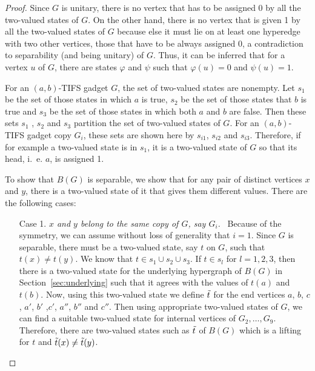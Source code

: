 \documentclass[%
12pt,
prereprint,
showpacs,
showkeys,
preprintnumbers,
amsmath,amssymb,
aps,
pra,
longbibliography,
notitlepage
]{revtex4-1}
\theoremstyle{definition}
\begin{document}
	\begin{proof}
		Since $G$ is unitary, there is no vertex that has to be assigned 0 by all the two-valued states of $G$. On the other hand, there is no vertex that is given 1 by all the two-valued states of $G$ because else it must lie on at least one hyperedge with two other vertices, those that have to be always assigned 0, a contradiction to separability (and being unitary) of $G$. Thus, it can be inferred that for a vertex $u$ of $G$, there are states $\varphi$ and $\psi$ such that $\varphi (u)=0$ and $\psi (u)=1$.
		
		For an $(a ,b )$-TIFS gadget $G$, the set of two-valued states are nonempty. Let $s_{1}$ be the set of those states in which $a$ is true, $s_{2}$ be the set of those states that $b$ is true and $s_{3}$ be the set of those states in which both $a$ and $b$ are false. Then these sets $s_{1}$ , $s_{2}$ and $s_{3}$ partition the set of two-valued states of $G$. For an $(a ,b )$-TIFS gadget copy $G_i$, these sets are shown here by $s_{i1}$, $s_{i2}$ and $s_{i3}$. Therefore, if for example a two-valued state is in $s_{1}$, it is a two-valued state of $G$ so that its head, i.~e. $a$, is assigned 1.
		
		To show that $B(G)$ is separable, we show that for any pair of distinct vertices $x$ and $y$, there is a two-valued state of it that gives them different values. There are the following cases:
		
		\begin{itemize}
			\item[Case 1.] \emph{$x$ and $y$ belong to the same copy of $G$, say $G_i$.} \ Because of the symmetry, we can assume without loss of generality that $i=1$.  Since $G$ is separable, there must be a two-valued state, say $t$ on $G$, such that $t(x)\neq t(y)$. We know that $t\in s_{1}\cup s_{2}\cup s_{3}$. If $t\in s_l$ for $l=1,2,3$, then there is a two-valued state for the underlying hypergraph of $B(G)$ in Section~\ref{sec:underlying} such that it agrees with the values of $t(a)$ and $t(b)$. Now, using this two-valued state we define $\Tilde{t}$ for the end vertices $a$, $b$, $c$, $a'$, $b'$ ,$c'$, $a''$, $b''$ and $c''$. Then using appropriate two-valued states of $G$, we can find a suitable two-valued state for internal vertices of $G_2,\ldots,G_9$. Therefore, there are two-valued states such as $\Tilde{t}$ of $B(G)$ which is a lifting for $t$ and  $\Tilde{t}(x) \neq \Tilde{t}(y)$.
			

\end{itemize}
\end{proof}
\end{document}

